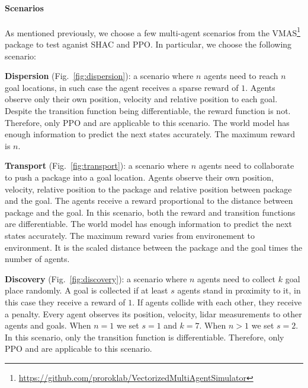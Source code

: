 \paragraph{Scenarios}
As mentioned previously, we choose a few multi-agent scenarios from the VMAS\footnote{\url{https://github.com/proroklab/VectorizedMultiAgentSimulator}} package to test \fname{} aganist SHAC and PPO. In particular, we choose the following scenario:
\begin{compactitem}
    \item \textbf{Dispersion} (Fig.~\ref{fig:dispersion}): 
         a scenario where $n$ agents need to reach $n$ goal locations, in such case the agent receives a sparse reward of $1$. Agents observe only their own position, velocity and relative position to each goal. 
         Despite the transition function being differentiable, the reward function is not. Therefore, only PPO and \fname{} are applicable to this scenario. 
         The world model has enough information to predict the next states accurately.
         The maximum reward is $n$.
    \item \textbf{Transport} (Fig.~\ref{fig:transport}): 
         a scenario where $n$ agents need to collaborate to push a package into a goal location. Agents observe their own position, velocity, relative position to the package and relative position between package and the goal. The agents receive a reward proportional to the distance between package and the goal. 
         In this scenario, both the reward and transition functions are differentiable. 
         The world model has enough information to predict the next states accurately.
         The maximum reward varies from environement to environment. It is the scaled distance between the package and the goal times the number of agents.
    \item \textbf{Discovery} (Fig.~\ref{fig:discovery}): 
         a scenario where $n$ agents need to collect $k$ goal place randomly. A goal is collected if at least $s$ agents stand in proximity to it, in this case they receive a reward of $1$. If agents collide with each other, they receive a penalty. Every agent observes its position, velocity, lidar measurements to other agents and goals. When $n=1$ we set $s=1$ and $k=7$. When $n>1$ we set $s=2$.
         In this scenario, only the transition function is differentiable. Therefore, only PPO and \fname{} are applicable to this scenario. 

\end{compactitem}
